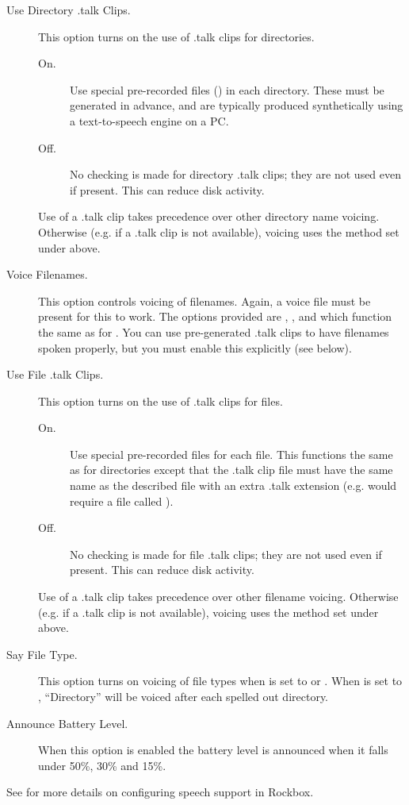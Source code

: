 \begin{description}
  \item[Use Directory .talk Clips.]
    This option turns on the use of .talk clips for directories. 
    \begin{description}
    \item[On.]
      Use special pre-recorded files () in each 
      directory. These must be generated in advance, and are typically 
      produced synthetically using a text-to-speech engine on a PC.
    \item[Off.]
      No checking is made for directory .talk clips; they are not used even if present.
      This can reduce disk activity.
    \end{description}
    Use of a .talk clip takes precedence over other directory name voicing. Otherwise 
    (e.g. if a .talk clip is not available), voicing uses the method set under 
     above.

  \item[Voice Filenames.]
    This option controls voicing of filenames. Again, a voice file must be present 
    for this to work. The options provided are , , 
    and  which function the same as for .
    You can use pre-generated .talk clips to have filenames spoken properly, but
    you must enable this explicitly (see below).

  \item[Use File .talk Clips.]
    This option turns on the use of .talk clips for files. 
    \begin{description}
    \item[On.]
      Use special pre-recorded files for each file.
      This functions the same as for directories except that the .talk clip file 
      must have the same name as the described file with an extra .talk extension 
      (e.g.  would require a file called ).
    \item[Off.]
      No checking is made for file .talk clips; they are not used even if present.
      This can reduce disk activity.
    \end{description}
    Use of a .talk clip takes precedence over other filename voicing. Otherwise 
    (e.g. if  a .talk clip is not available), voicing uses the method set under
      above.

  \item[Say File Type.]
    This option turns on voicing of file types when 
    is set to  or .
    When  is set to , ``Directory''
    will be voiced after each spelled out directory.

  \item[Announce Battery Level.]
    When this option is enabled the battery level is announced when it falls
    under 50\%, 30\% and 15\%.

  \end{description}

See  for more details on configuring speech support in Rockbox.

